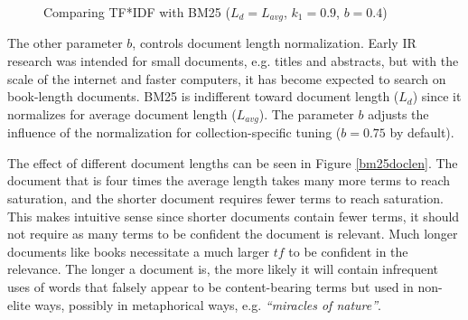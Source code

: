 \begin{figure}[h]
  
  
  \caption{Comparing TF*IDF with BM25 ($L_d = L_{avg}$, $k_1 = 0.9$, $b = 0.4$)} \label{tfm}
\end{figure}



The other parameter $b$, controls document length normalization. Early IR research was intended for small documents, e.g. titles and abstracts, but with the scale of the internet and faster computers, it has become expected to search on book-length documents. BM25 is indifferent toward document length ($L_d$) since it normalizes for average document length ($L_{avg}$). The parameter $b$ adjusts the influence of the normalization for collection-specific tuning ($b=0.75$ by default). 

The effect of different document lengths can be seen in Figure \ref{bm25doclen}. The document that is four times the average length takes many more terms to reach saturation, and the shorter document requires fewer terms to reach saturation. This makes intuitive sense since shorter documents contain fewer terms, it should not require as many terms to be confident the document is relevant. Much longer documents like books necessitate a much larger $\mathit{tf}$ to be confident in the relevance. The longer a document is, the more likely it will contain infrequent uses of words that falsely appear to be content-bearing terms but used in non-elite ways, possibly in metaphorical ways, e.g. \textit{``miracles of nature''}.

